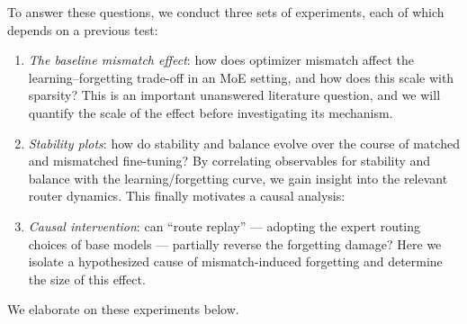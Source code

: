 \documentclass[11pt,a4paper]{article}
\begin{document}
To answer these questions, we conduct three sets of experiments, each of which depends on a previous test:
\begin{enumerate}[label=\arabic*.]
    \item \textit{The baseline mismatch effect}: how does optimizer mismatch affect the learning--forgetting trade-off in an MoE setting, and how does this scale with sparsity? This is an important unanswered literature question, and we will quantify the scale of the effect before investigating its mechanism.
    \item \textit{Stability plots}: how do stability and balance evolve over the course of matched and mismatched fine-tuning? By correlating observables for stability and balance with the learning/forgetting curve, we gain insight into the relevant router dynamics. This finally motivates a causal analysis:
    \item \textit{Causal intervention}: can ``route replay'' --- adopting the expert routing choices of base models --- partially reverse the forgetting damage? Here we isolate a hypothesized cause of mismatch-induced forgetting and determine the size of this effect.
\end{enumerate}

We elaborate on these experiments below.
\end{document}

